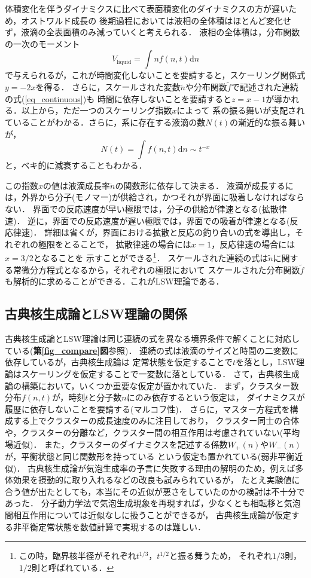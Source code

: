 \documentclass[topics,b5paper,papersize,twocolumn]{jsarticle}
\newcommand{\diff}{\mathrm{d}}
\begin{document}
体積変化を伴うダイナミクスに比べて表面積変化のダイナミクスの方が遅いため，オストワルド成長の
後期過程においては液相の全体積はほとんど変化せず，液滴の全表面積のみ減っていくと考えられる．
液相の全体積は，分布関数の一次のモーメント
\begin{equation}
V_\mathrm{liquid} = \int n f(n,t) \diff n
\end{equation}
で与えられるが，これが時間変化しないことを要請すると，スケーリング関係式$y = -2 x$を得る．
さらに，スケールされた変数$\tilde{n}$や分布関数$\tilde{f}$で記述された連続の式(\ref{eq_continuous})も
時間に依存しないことを要請すると$z = x -1$が導かれる．以上から，ただ一つのスケーリング指数$x$によって
系の振る舞いが支配されていることがわかる．さらに，系に存在する液滴の数$N(t)$の漸近的な振る舞いが，
\begin{equation}
N(t) = \int f(n,t) \diff n \sim t^{-x}
\end{equation}
と，ベキ的に減衰することもわかる．

この指数$x$の値は液滴成長率$\dot{n}$の関数形に依存して決まる．
液滴が成長するには，外界から分子(モノマー)が供給され，かつそれが界面に吸着しなければならない．
界面での反応速度が早い極限では，分子の供給が律速となる(拡散律速)．
逆に，界面での反応速度が遅い極限では，界面での吸着が律速となる(反応律速)．
詳細は省くが，界面における拡散と反応の釣り合いの式を導出し，それぞれの極限をとることで，
拡散律速の場合には$x = 1$，反応律速の場合には$x = 3/2$となることを
示すことができる\footnote{この時，臨界核半径がそれぞれ$t^{1/3}$，$t^{1/2}$と振る舞うため，
それぞれ$1/3$則，$1/2$則と呼ばれている．}．
スケールされた連続の式は$\tilde{n}$に関する常微分方程式となるから，それぞれの極限において
スケールされた分布関数$\tilde{f}$も解析的に求めることができる．これがLSW理論である．

\subsection{古典核生成論とLSW理論の関係}

古典核生成論とLSW理論は同じ連続の式を異なる境界条件で解くことに対応している(\textbf{第\ref{fig_compare}図}参照)．
連続の式は液滴のサイズと時間の二変数に依存しているが，古典核生成論は
定常状態を仮定することで$t$を落とし，LSW理論はスケーリングを仮定することで一変数に落としている．
さて，古典核生成論の構築において，いくつか重要な仮定が置かれていた．
まず，クラスター数分布$f(n,t)$が，時刻$t$と分子数$n$にのみ依存するという仮定は，
ダイナミクスが履歴に依存しないことを要請する(マルコフ性)．
さらに，マスター方程式を構成する上でクラスターの成長速度のみに注目しており，
クラスター同士の合体や，クラスターの分離など，クラスター間の相互作用は考慮されていない(平均場近似)．
また，クラスターのダイナミクスを記述する係数$W_+(n)$や$W_-(n)$が，平衡状態と同じ関数形を持っている
という仮定も置かれている(弱非平衡近似)．
古典核生成論が気泡生成率の予言に失敗する理由の解明のため，例えば多体効果を摂動的に取り入れるなどの改良も試みられているが，
たとえ実験値に合う値が出たとしても，本当にその近似が悪さをしていたのかの検討は不十分であった．
分子動力学法で気泡生成現象を再現すれば，少なくとも相転移と気泡間相互作用については近似なしに扱うことができるが，
古典核生成論が仮定する非平衡定常状態を数値計算で実現するのは難しい．
\end{document}
